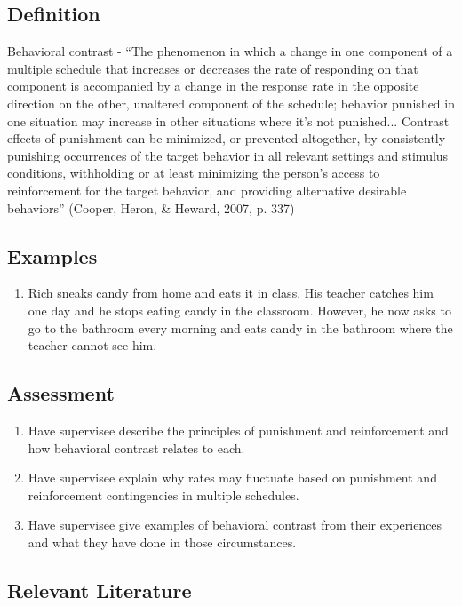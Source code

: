 \subsection{Definition} 
Behavioral contrast - ``The  phenomenon in which a change in one component of a multiple schedule that increases or decreases the rate of responding on that component is accompanied by a change in the response rate in the opposite direction on the other, unaltered component of the schedule; behavior punished in one situation may increase in other situations where it's not punished... Contrast effects of punishment can be minimized, or prevented altogether, by consistently punishing occurrences of the target behavior in all relevant settings and stimulus conditions, withholding or at least minimizing the person's access to reinforcement for the target behavior, and providing alternative desirable behaviors'' (Cooper, Heron, \& Heward, 2007, p. 337)
%
\subsection{Examples}
\begin{enumerate}
\item Rich sneaks candy from home and eats it in class. His teacher catches him one day and he stops eating candy in the classroom. However, he now asks to go to the bathroom every morning and eats candy in the bathroom where the teacher cannot see him. 
%
\end{enumerate}
%
\subsection{Assessment}
\begin{enumerate}
\item Have supervisee describe the principles of punishment and reinforcement and how behavioral contrast relates to each.
\item Have supervisee explain why rates may fluctuate based on punishment and reinforcement contingencies in multiple schedules.
\item Have supervisee give examples of behavioral contrast from their experiences and what they have done in those circumstances.
%
\end{enumerate}
%
\subsection{Relevant Literature}
\begin{refsection}
\nocite{cooper2007applied,
        gross1981behavioral,
        koegel1980behavioral,
        nevin1992behavioral,
        reynolds1961behavioral}
\printbibliography[heading=none]
\end{refsection}
%
